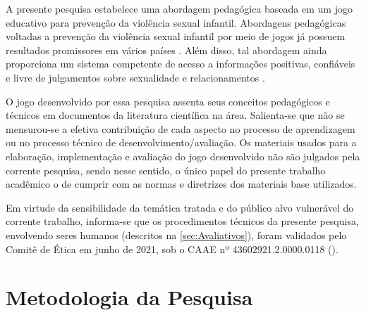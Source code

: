 A presente pesquisa estabelece uma abordagem pedagógica baseada em um jogo educativo para prevenção da violência sexual infantil. Abordagens pedagógicas voltadas a prevenção da violência sexual infantil por meio de jogos já possuem resultados promissores em vários países \cite{muller2014child, fingerle2018abschlussbericht}. Além disso, tal abordagem ainda proporciona um sistema competente de acesso a informações positivas, confiáveis e livre de julgamentos sobre sexualidade e relacionamentos \cite{unesco2018international}. %

O jogo desenvolvido por essa pesquisa assenta seus conceitos pedagógicos e técnicos em documentos da literatura científica na área. Salienta-se que não se mensurou-se a efetiva contribuição de cada aspecto no processo de aprendizagem ou no processo técnico de desenvolvimento/avaliação. Os materiais usados para a elaboração, implementação e avaliação do jogo desenvolvido não são julgados pela corrente pesquisa, sendo nesse sentido, o único papel do presente trabalho acadêmico o de cumprir com as normas e diretrizes dos materiais base utilizados. 


Em virtude da sensibilidade da temática tratada e do público alvo vulnerável do corrente trabalho, informa-se que os procedimentos técnicos da presente pesquisa, envolvendo seres humanos (descritos na \autoref{sec:Avaliativos}), foram validados pelo Comitê de Ética em junho de 2021, sob o \ac{CAAE} nº 43602921.2.0000.0118 (). %

\newpage
\section{Metodologia da Pesquisa}\label{sec:Metodologia}

